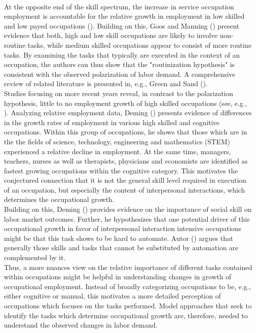 \documentclass[../main.tex]{subfiles}
\begin{document}
\\
At the opposite end of the skill spectrum, the increase in service occupation employment is accountable for the relative growth in employment in low skilled and low payed occupations (\cite{autor2010inequality}). Building on this, Goos and Manning (\citeyear{goos2007lousy}) present evidence that both, high and low skill occupations are likely to involve non-routine tasks, while medium skilled occupations appear to consist of more routine tasks. By examining the tasks that typically are executed in the context of an occupation, the authors can thus show that the "routinization hypothesis" is consistent with the observed polarization of labor demand. A comprehensive review of related literature is presented in, e.g., Green and Sand (\citeyear{green2015has}).
\\
Studies focusing on more recent years reveal, in contrast to the polarization hypothesis, little to no employment growth of high skilled occupations (see, e.g., \cite{beaudry2016great}). Analyzing relative employment data, Deming (\citeyear{deming2017growing}) presents evidence of differences in the growth rates of employment in various high skilled and cognitive occupations. Within this group of occupations, he shows that those which are in the the fields of science, technology, engineering and mathematics (STEM) experienced a relative decline in employment. At the same time, managers, teachers, nurses as well as therapists, physicians and economists are identified as fastest growing occupations within the cognitive category. This motivates the conjectured connection that it is not the general skill level required in execution of an occupation, but especially the content of interpersonal interactions, which determines the occupational growth.
\\
Building on this, Deming (\citeyear{deming2017growing}) provides evidence on the importance of social skill on labor market outcomes. Further, he hypothesizes that one potential driver of this occupational growth in favor of interpersonal interaction intensive occupations might be that this task shows to be hard to automate. Autor (\citeyear{autor2015there}) argues that generally those skills and tasks that cannot be substituted by automation are complemented by it. 
\\
Thus, a  more nuances view on the relative importance of different tasks contained within occupations might be helpful in understanding changes in growth of occupational employment. Instead of broadly categorizing occupations to be, e.g., either cognitive or manual, this motivates a more detailed perception of occupations which focuses on the tasks performed. Model approaches that seek to identify the tasks which determine occupational growth are, therefore, needed to understand the observed changes in labor demand.
\end{document}

